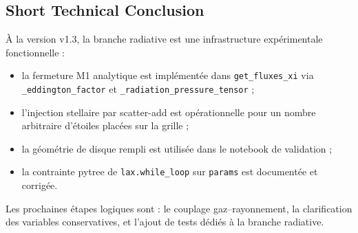 \documentclass[a4paper, 11pt]{article}
\begin{document}
\subsection{Short Technical Conclusion}
À la version v1.3, la branche radiative est une infrastructure expérimentale fonctionnelle :
\begin{itemize}
    \item la fermeture M1 analytique est implémentée dans \texttt{get\_fluxes\_xi} via \texttt{\_eddington\_factor} et \texttt{\_radiation\_pressure\_tensor} ;
    \item l'injection stellaire par scatter-add est opérationnelle pour un nombre arbitraire d'étoiles placées sur la grille ;
    \item la géométrie de disque rempli est utilisée dans le notebook de validation ;
    \item la contrainte pytree de \texttt{lax.while\_loop} sur \texttt{params} est documentée et corrigée.
\end{itemize}
Les prochaines étapes logiques sont : le couplage gaz--rayonnement, la clarification des variables conservatives, et l'ajout de tests dédiés à la branche radiative.
\end{document}
